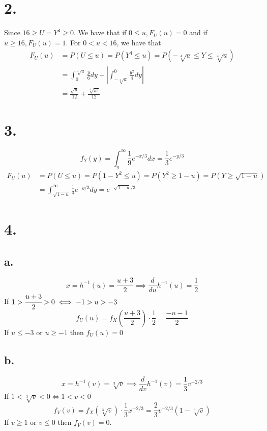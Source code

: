 \documentclass[11pt]{article}
\begin{document}
\section*{2.}
Since $ 16 \ge U = Y^4 \ge 0$. We have that if $0\le u, F_U(u) = 0$ and if $u\ge 16, F_U(u) = 1$.
For $0<u<16$, we have that
\begin{equation*}
    \begin{aligned}
        F_U(u) &= P(U\le u) = P(Y^4 \le u) = P(-\sqrt[4]{u} \le Y \le \sqrt[4]{u}) \\
        &=  \int_0^{\sqrt[4]{u}} \frac{y}{6} dy + \left|\int_{-\sqrt[4]{u}}^0 \frac{y^2}{4} dy \right|\\
        &= \frac{\sqrt{u}}{12} + \frac{\sqrt[4]{u^3}}{12}
    \end{aligned}
\end{equation*} 
\pagebreak
\section*{3.}
\[
    f_Y(y) = \int_y^\infty \frac{1}{9}e^{-x/3} dx = \frac{1}{3}e^{-y/3}    
\]
\begin{equation*}
    \begin{aligned}
        F_U(u) &= P(U\le u) = P(1-Y^2 \le u) = P(Y^2 \ge 1-u) = P(Y\ge \sqrt{1-u}) \\
        &= \int_{\sqrt{1-u}}^\infty \frac{1}{3}e^{-y/3} dy  = e^{-\sqrt{1-u}/3} 
    \end{aligned}
\end{equation*}
\pagebreak
\section*{4.}
\subsection*{a.}
\[
    x = h^{-1}(u) = \frac{u+3}{2} \implies \frac{d}{du}h^{-1}(u) = \frac{1}{2}
\]
If $1>\cfrac{u+3}{2} > 0 \iff -1>u>-3$
\[
    f_U(u) = f_X\left(\frac{u+3}{2}\right) \cdot \frac{1}{2} = \frac{-u-1}{2}  
\]
If $u\le -3$ or $u \ge -1$ then $f_U(u) = 0$
\subsection*{b.}
\[
    x = h^{-1}(v) = \sqrt[3]{v} \implies \frac{d}{dv}h^{-1}(v) = \frac{1}{3} v^{-2/3}     
\]
If $1<\sqrt[3]{v}<0 \iff 1<v<0$
\[
    f_V(v) = f_X(\sqrt[3]{v}) \cdot \frac{1}{3}x^{-2/3} = \frac{2}{3}v^{-2/3}(1-\sqrt[3]{v}) 
\]
If $v\ge 1$ or $v \le 0$ then $f_V(v) = 0$.
\pagebreak
\end{document}
